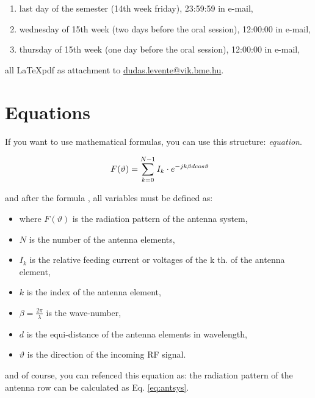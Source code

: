 \begin{enumerate}
\item last day of the semester (14th week friday), 23:59:59 in e-mail,
\item wednesday of 15th week (two days before the oral session), 12:00:00 in e-mail,
\item thursday of 15th week (one day before the oral session), 12:00:00 in e-mail,
\end{enumerate}

all \LaTeX pdf as attachment to \url{dudas.levente@vik.bme.hu}.

\section{Equations}

If you want to use mathematical formulas, you can use this structure: \textit{equation}.

\begin{equation}
\centering
\ F ( \vartheta ) = \sum_{k=0}^{N-1} I_k \cdot e^{-jk \beta d cos \vartheta}
\label{eq:antsys}
\end{equation}

and after the formula \cite{diploma}, all variables must be defined as:

\begin{itemize}
\item where $ F ( \vartheta ) $ is the radiation pattern of the antenna system,
\item $ N $ is the number of the antenna elements,
\item $ I_k $ is the relative feeding current or voltages of the k th. of the antenna element,
\item $ k $ is the index of the antenna element,
\item $ \beta = \frac{2 \pi}{ \lambda } $ is the wave-number,
\item $ d $ is the equi-distance of the antenna elements in wavelength,
\item $ \vartheta $ is the direction of the incoming RF signal.
\end{itemize}

and of course, you can refenced this equation as: the radiation pattern of the antenna row can be calculated as Eq. \ref{eq:antsys}.